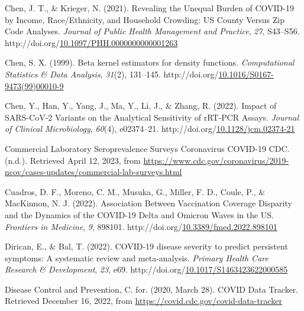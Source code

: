 \documentclass[12pt,twoside]{smiththesis}
\newlength{\cslhangindent}
\newenvironment{CSLReferences}[2] %
 {%
\setlength{\parindent}{0pt}
\ifodd #1 \everypar{\setlength{\hangindent}{\cslhangindent}}\ignorespaces\fi
\ifnum #2 > 0
\setlength{\parskip}{#2\baselineskip}
  \fi
}%
{}
\begin{document}
\begin{CSLReferences}{1}{0}
\leavevmode{}%
Chen, J. T., \& Krieger, N. (2021). Revealing the {Unequal Burden} of {COVID-19} by {Income}, {Race}/{Ethnicity}, and {Household Crowding}: {US County Versus Zip Code Analyses}. \emph{Journal of Public Health Management and Practice}, \emph{27}, S43--S56. http://doi.org/\href{https://doi.org/10.1097/PHH.0000000000001263}{10.1097/PHH.0000000000001263}

\leavevmode{}%
Chen, S. X. (1999). Beta kernel estimators for density functions. \emph{Computational Statistics \& Data Analysis}, \emph{31}(2), 131--145. http://doi.org/\href{https://doi.org/10.1016/S0167-9473(99)00010-9}{10.1016/S0167-9473(99)00010-9}

\leavevmode{}%
Chen, Y., Han, Y., Yang, J., Ma, Y., Li, J., \& Zhang, R. (2022). Impact of {SARS-CoV-2 Variants} on the {Analytical Sensitivity} of {rRT-PCR Assays}. \emph{Journal of Clinical Microbiology}, \emph{60}(4), e02374--21. http://doi.org/\href{https://doi.org/10.1128/jcm.02374-21}{10.1128/jcm.02374-21}

\leavevmode{}%
Commercial {Laboratory Seroprevalence Surveys} \textbar{} {Coronavirus} \textbar{} {COVID-19} \textbar{} {CDC}. (n.d.). Retrieved April 12, 2023, from \url{https://www.cdc.gov/coronavirus/2019-ncov/cases-updates/commercial-lab-surveys.html}

\leavevmode{}%
Cuadros, D. F., Moreno, C. M., Musuka, G., Miller, F. D., Coule, P., \& MacKinnon, N. J. (2022). Association {Between Vaccination Coverage Disparity} and the {Dynamics} of the {COVID-19 Delta} and {Omicron Waves} in the {US}. \emph{Frontiers in Medicine}, \emph{9}, 898101. http://doi.org/\href{https://doi.org/10.3389/fmed.2022.898101}{10.3389/fmed.2022.898101}

\leavevmode{}%
Dirican, E., \& Bal, T. (2022). {COVID-19} disease severity to predict persistent symptoms: A systematic review and meta-analysis. \emph{Primary Health Care Research \& Development}, \emph{23}, e69. http://doi.org/\href{https://doi.org/10.1017/S1463423622000585}{10.1017/S1463423622000585}

\leavevmode{}%
Disease Control and Prevention, C. for. (2020, March 28). {COVID Data Tracker}. Retrieved December 16, 2022, from \url{https://covid.cdc.gov/covid-data-tracker}


\end{CSLReferences}
\end{document}
